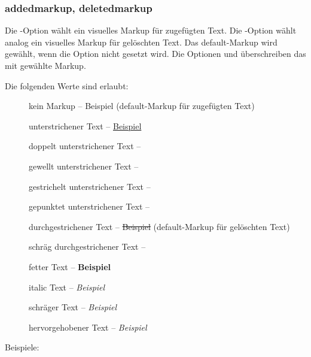 \subsubsection{addedmarkup, deletedmarkup}

Die -Option wählt ein visuelles Markup für zugefügten Text.
Die -Option wählt analog ein visuelles Markup für gelöschten Text.
Das default-Markup wird gewählt, wenn die Option nicht gesetzt wird.
Die Optionen  und  überschreiben das mit  gewählte Markup.

Die folgenden Werte sind erlaubt:
\begin{description}
	\item [] kein Markup -- Beispiel (default-Markup für zugefügten Text)
	\item [] unterstrichener Text -- \uline{Beispiel}
	\item [] doppelt unterstrichener Text -- 
	\item [] gewellt unterstrichener Text -- 
	\item [] gestrichelt unterstrichener Text -- 
	\item [] gepunktet unterstrichener Text -- 
	\item [] durchgestrichener Text -- \sout{Beispiel} (default-Markup für gelöschten Text)
	\item [] schräg durchgestrichener Text -- 
	\item [] fetter Text -- \textbf{Beispiel}
	\item [] italic Text -- \textit{Beispiel}
	\item [] schräger Text -- \textsl{Beispiel}
	\item [] hervorgehobener Text -- \emph{Beispiel}
\end{description}

Beispiele:

\\
\\
\\
\\

